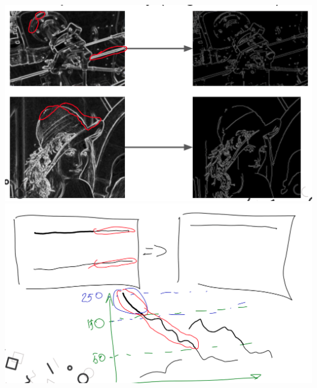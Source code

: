 \documentclass[11pt]{article}
\begin{document}
    \includegraphics[scale=0.2]{canny0}
    \includegraphics[scale=0.2]{canny}
\end{document}
